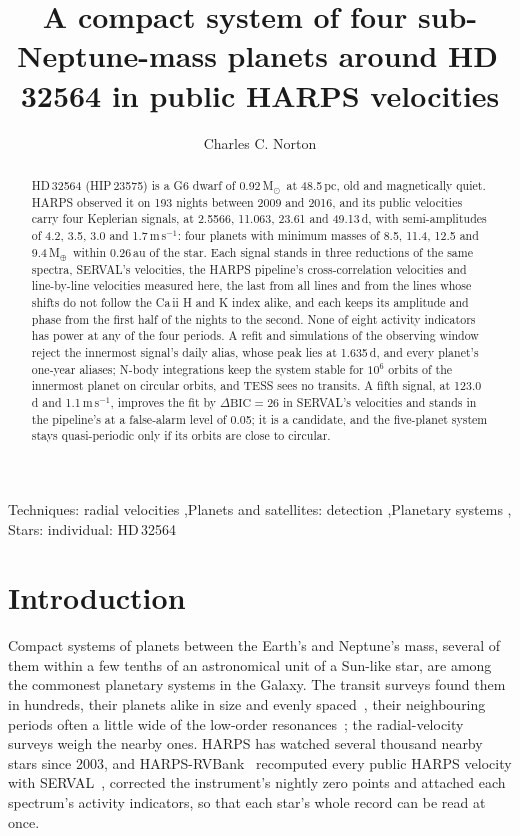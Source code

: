 \documentclass[3p,11pt]{elsarticle}
\newcommand{\ms}{m\,s$^{-1}$}
\newcommand{\Msun}{M$_\odot$}
\newcommand{\Mearth}{M$_\oplus$}
\begin{document}
\begin{frontmatter}

\title{A compact system of four sub-Neptune-mass planets around HD\,32564 in public HARPS velocities}

\author{Charles C. Norton}

\begin{abstract}
HD\,32564 (HIP\,23575) is a G6 dwarf of 0.92\,\Msun\ at 48.5\,pc, old and magnetically quiet. HARPS
observed it on 193 nights between 2009 and 2016, and its public velocities carry four Keplerian
signals, at 2.5566, 11.063, 23.61 and 49.13\,d, with semi-amplitudes of 4.2, 3.5, 3.0 and
1.7\,\ms: four planets with minimum masses of 8.5, 11.4, 12.5 and 9.4\,\Mearth\ within 0.26\,au of
the star. Each signal stands in three reductions of the same spectra, SERVAL's velocities, the HARPS
pipeline's cross-correlation velocities and line-by-line velocities measured here, the last from all
lines and from the lines whose shifts do not follow the Ca\,{\sc ii} H and K index alike, and each keeps
its amplitude and phase from the first half of the nights to the second. None of eight activity
indicators has power at any of the four periods. A refit and simulations of the observing window
reject the innermost signal's daily alias, whose peak lies at 1.635\,d, and every planet's one-year
aliases; N-body integrations keep the system stable for $10^6$ orbits of the innermost planet on
circular orbits, and TESS sees no transits. A fifth signal, at 123.0\,d and 1.1\,\ms, improves the fit
by $\Delta\mathrm{BIC} = 26$ in SERVAL's velocities and stands in the pipeline's at a false-alarm level
of 0.05; it is a candidate, and the five-planet system stays quasi-periodic only if its orbits are close
to circular.
\end{abstract}

\begin{keyword}
Techniques: radial velocities \sep Planets and satellites: detection \sep Planetary systems \sep
Stars: individual: HD\,32564
\end{keyword}

\end{frontmatter}

\section{Introduction}\label{sec:intro}

Compact systems of planets between the Earth's and Neptune's mass, several of them within a few tenths
of an astronomical unit of a Sun-like star, are among the commonest planetary systems in the Galaxy. The
transit surveys found them in hundreds, their planets alike in size and evenly spaced~\cite{Weiss2018},
their neighbouring periods often a little wide of the low-order resonances~\cite{Fabrycky2014}; the
radial-velocity surveys weigh the nearby ones. HARPS has watched several thousand nearby stars since
2003, and HARPS-RVBank~\cite{Trifonov2020} recomputed every public HARPS velocity with
SERVAL~\cite{Zechmeister2018}, corrected the instrument's nightly zero points and attached each
spectrum's activity indicators, so that each star's whole record can be read at once.
\end{document}
